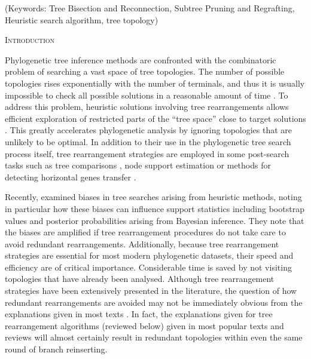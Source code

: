 \documentclass[12pt,letterpaper]{article}
\renewcommand{\section}[1]{%
\bigskip
\begin{center}
\begin{Large}
\normalfont\scshape #1
\medskip
\end{Large}
\end{center}}
\begin{document}
\noindent (Keywords: Tree Bisection and Reconnection, Subtree Pruning and Regrafting, Heuristic search algorithm, tree topology)\\

\vspace{1.5in}

\newpage 

%
%
\section{Introduction}


Phylogenetic tree inference methods are confronted with the combinatoric problem of searching a vast space of tree topologies. 
The number of possible topologies rises exponentially with the number of terminals, and thus it is usually impossible to check all possible solutions in a reasonable amount of time \citep{Felsenstein:1978vh}.
To address this problem, heuristic solutions involving tree rearrangements allows efficient exploration of restricted parts of the ``tree space'' close to target solutions \citep{john2016review}.
This greatly accelerates phylogenetic analysis by ignoring topologies that are unlikely to be optimal.
In addition to their use in the phylogenetic tree search process itself, tree rearrangement strategies are employed in some post-search tasks such as tree comparisons \citep[e.g.][]{allen2001subtree,kuhner2015treComparison}, node support estimation \citep[e.g.][]{goloboff2014bias} or methods for detecting horizontal genes transfer \citep[e.g.][]{mcfadden1995something,bordewich2005computational}.

Recently, \citet{goloboff2014bias} examined biases in tree searches arising from heuristic methods, noting in particular how these biases can influence support statistics including bootstrap values and posterior probabilities arising from Bayesian inference.
They note that the biases are amplified if tree rearrangement procedures do not take care to avoid redundant rearrangements.
Additionally, because tree rearrangement strategies are essential for most modern phylogenetic datasets, their speed and efficiency are of critical importance.
Considerable time is saved by not visiting topologies that have already been analysed.
Although tree rearrangement strategies have been extensively presented in the literature, the question of how redundant rearrangements are avoided may not be immediately obvious from the explanations given in most texts \citep{swofford2003phylogeny,felsenstein2004inferring,wiley2011phylogenetics}.
In fact, the explanations given for tree rearrangement algorithms (reviewed below) given in most popular texts and reviews will almost certainly result in redundant topologies within even the same round of branch reinserting.
\end{document}

